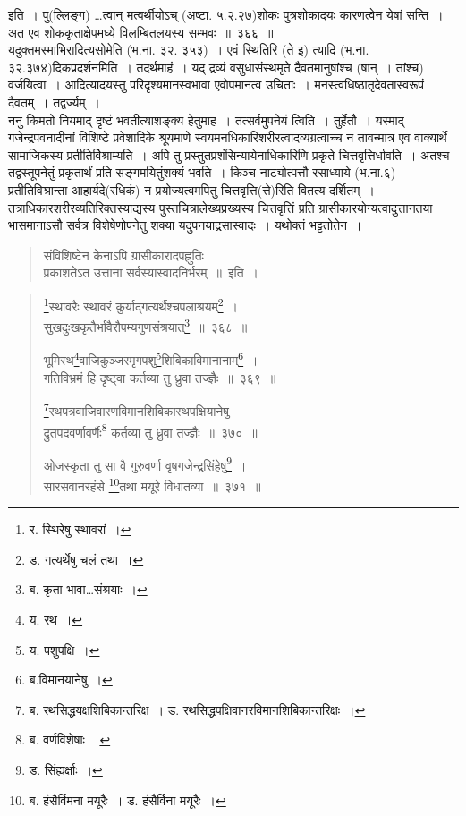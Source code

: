 \documentclass[11pt, openany]{book}
\begin{document}
\noindent
इति~। पु(ल्लिङ्ग) \ldots त्वान् मत्वर्थीयोऽच् (अष्टा. ५.२.२७)शोकः पुत्रशोकादयः कारणत्वेन येषां सन्ति~। अत एव शोककृताक्षेपमध्ये विलम्बितलयस्य सम्भवः~॥~३६६~॥\\

यदुक्तमस्माभिरादित्यसोमेति (भ.ना. ३२. ३५३)~। एवं स्थितिरि (ते इ) त्यादि (भ.ना. ३२.३७४)दिकप्रदर्शनमिति~। तदर्थमाहं~। {\qtt यद् द्रव्यं वसुधासंस्थ}मृते दैवतमानुषांश्च (षान्~। तांश्च) वर्जयित्वा~। आदित्यादयस्तु परिदृश्यमानस्वभावा एवोपमानत्व उचिताः~। मनस्त्वधिष्ठातृदेवतास्वरूपं दैवतम्~। तद्वर्ज्यम्~।\\

ननु किमतो नियमाद् दृष्टं भवतीत्याशङ्क्य हेतुमाह~। {\qtt तत्सर्वमुपनेयं} त्विति~। तुर्हेतौ~। यस्माद् गजेन्द्रपवनादीनां विशिष्टे प्रवेशादिके श्रूयमाणे स्वयमनधिकारिशरीरत्वादव्यग्रत्वाच्च न तावन्मात्र एव वाक्यार्थे सामाजिकस्य प्रतीतिर्विश्राम्यति~। अपि तु प्रस्तुतप्रशंसिन्यायेनाधिकारिणि प्रकृते चित्तवृत्तिर्धावति~। अतश्च तद्वस्तूपनेतुं प्रकृतार्थं प्रति सङ्गमयितुंशक्यं भवति~। किञ्च नाट्योत्पत्तौ रसाध्याये (भ.ना.६) प्रतीतिविश्रान्ता आहार्यदे(रधिकं) न प्रयोज्यत्वमपितु चित्तवृत्ति(त्ते)रिति वितत्य दर्शितम्~। तत्राधिकारशरीरव्यतिरिक्तस्याद्यस्य पुस्तचित्रालेख्यप्रख्यस्य चित्तवृत्तिं प्रति ग्रासीकारयोग्यत्वादुत्तानतया भासमानाऽसौ सर्वत्र विशेषेणोपनेतु शक्या यदुपनयाद्रसास्वादः~। यथोक्तं भट्टतोतेन~। 

\begin{quote}
{\qt संविशिष्टेन केनाऽपि ग्रासीकारादपह्नुतिः~।\\
 प्रकाशतेऽत उत्ताना सर्वस्यास्वादनिर्भरम्~॥}~इति~।
\end{quote}

\newpage

\begin{quote}
{\na \renewcommand{\thefootnote}{1}\footnote{र. स्थिरेषु स्थावरां~।}स्थावरैः स्थावरं कुर्याद्गत्यर्थैश्चपलाश्रयम्\renewcommand{\thefootnote}{2}\footnote{ड. गत्यर्थेषु चलं तथा~।}~।\\
 सुखदुःखकृतैर्भावैरौपम्यगुणसंश्रयात्\renewcommand{\thefootnote}{3}\footnote{ब. कृता भावा\ldots संश्रयाः~।}~॥~३६८~॥

 भूमिस्थ\renewcommand{\thefootnote}{4}\footnote{य. रथ~।}वाजिकुञ्जरमृगपशु\renewcommand{\thefootnote}{5}\footnote{य. पशुपक्षि~।}शिबिकाविमानानाम्\renewcommand{\thefootnote}{6}\footnote{ब.विमानयानेषु~।}~।\\
 गतिविभ्रमं हि दृष्ट्वा कर्तव्या तु ध्रुवा तज्ज्ञैः~॥~३६९~॥

 \renewcommand{\thefootnote}{7}\footnote{ब. रथसिद्धयक्षशिबिकान्तरिक्ष~। ड. रथसिद्धपक्षिवानरविमानशिबिकान्तरिक्षः~।}रथपत्रवाजिवारणविमानशिबिकास्थपक्षियानेषु~।\\
 द्रुतपदवर्णावर्णैः\renewcommand{\thefootnote}{8}\footnote{ब. वर्णविशेषाः~।} कर्तव्या तु ध्रुवा तज्ज्ञैः~॥~३७०~॥

 ओजस्कृता तु सा वै गुरुवर्णा वृषगजेन्द्रसिंहेषु\renewcommand{\thefootnote}{9}\footnote{ड. सिंह्यर्क्षाः~।}~।\\
 सारसवानरहंसे \renewcommand{\thefootnote}{10}\footnote{ब. हंसैर्विमना मयूरैः~। ड. हंसैर्विना मयूरैः~।}तथा मयूरे विधातव्या~॥~३७१~॥}
\end{quote}
\end{document}
